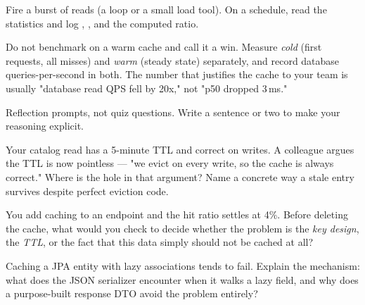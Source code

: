 Fire a burst of reads (a loop or a small load tool). On a schedule, read the  statistics and log , , and the computed ratio.

\begin{prodtip}
Do not benchmark on a warm cache and call it a win. Measure \emph{cold} (first requests, all misses) and \emph{warm} (steady state) separately, and record database queries-per-second in both. The number that justifies the cache to your team is usually "database read QPS fell by 20x," not "p50 dropped 3\,ms."
\end{prodtip}


Reflection prompts, not quiz questions. Write a sentence or two to make your reasoning explicit.

\begin{thinkbox}
Your catalog read has a 5-minute TTL and correct  on writes. A colleague argues the TTL is now pointless --- "we evict on every write, so the cache is always correct." Where is the hole in that argument? Name a concrete way a stale entry survives despite perfect eviction code.
\end{thinkbox}

\begin{thinkbox}
You add caching to an endpoint and the hit ratio settles at 4\%. Before deleting the cache, what would you check to decide whether the problem is the \emph{key design}, the \emph{TTL}, or the fact that this data simply should not be cached at all?
\end{thinkbox}

\begin{thinkbox}
Caching a JPA entity with lazy associations tends to fail. Explain the mechanism: what does the JSON serializer encounter when it walks a lazy field, and why does a purpose-built response DTO avoid the problem entirely?
\end{thinkbox}


